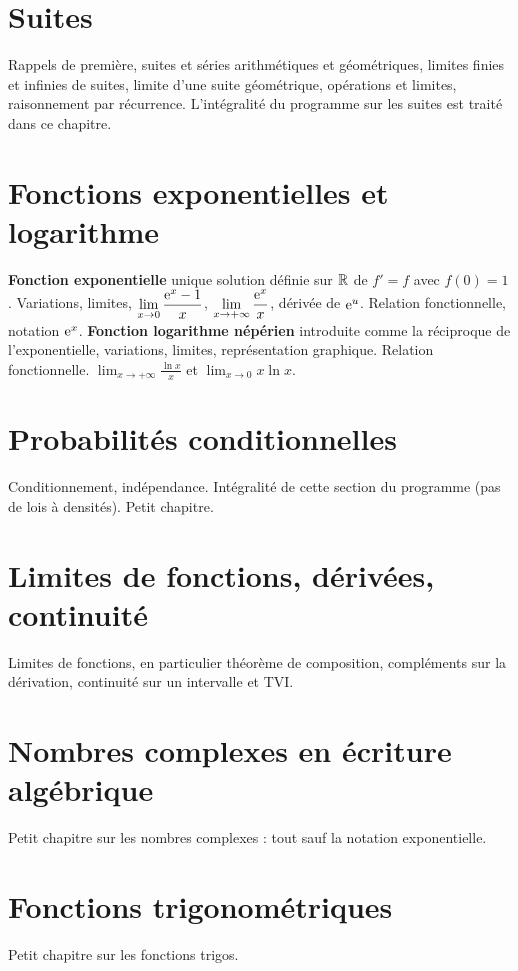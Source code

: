 \documentclass[a4paper,11pt,DIV11,BCOR0mm]{scrartcl}
\begin{document}
\section{Suites}
Rappels de première, suites et séries arithmétiques et géométriques, limites finies et infinies de suites,
limite d'une suite géométrique, opérations et limites,
raisonnement par récurrence. L'intégralité du programme sur les suites est traité dans ce chapitre.

\section{Fonctions exponentielles et logarithme}
\textbf{Fonction exponentielle} unique solution définie sur $\mathbb{R}$ de $f'=f$ avec $f(0)=1$. 
Variations, limites, $\displaystyle \lim_{x\to0}\frac{\mathrm{e}^x-1}{x}$, $\displaystyle \lim_{x\to+\infty}\frac{\mathrm{e}^x}{x}$, 
dérivée de $\mathrm{e}^u$. Relation fonctionnelle, notation $\mathrm{e}^x$. \textbf{Fonction logarithme népérien}
introduite comme la réciproque de l'exponentielle, variations, limites, représentation graphique.
Relation fonctionnelle. $\displaystyle \lim_{x\to+\infty}\frac{\ln x}{x}$ et $\displaystyle \lim_{x\to0}x\ln x$.

\section{Probabilités conditionnelles}
Conditionnement, indépendance. Intégralité de cette section du programme (pas de lois à densités).
Petit chapitre.

\section{Limites de fonctions, dérivées, continuité}
Limites de fonctions, en particulier théorème de composition, 
compléments sur la dérivation, continuité sur un intervalle et TVI. 

\section{Nombres complexes en écriture algébrique}
Petit chapitre sur les nombres complexes : tout sauf la notation exponentielle.
 
\section{Fonctions trigonométriques}
Petit chapitre sur les fonctions trigos.
\end{document}
